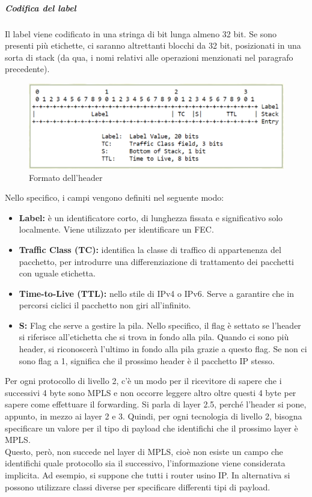 \documentclass{article}
\begin{document}
\subparagraph{Codifica del label} Il label viene codificato in una stringa di bit lunga almeno 32 bit. Se sono presenti più etichette, ci saranno altrettanti blocchi da 32 bit, posizionati in una sorta di stack (da qua, i nomi relativi alle operazioni menzionati nel paragrafo precedente).
\begin{figure}[H]
    \centering
    \includegraphics[scale=0.4]{figures/mpls header.png}
    \caption{Formato dell'header}
\end{figure}
Nello specifico, i campi vengono definiti nel seguente modo:
\begin{itemize}
    \item \textbf{Label:} è un identificatore corto, di lunghezza fissata e significativo solo localmente. Viene utilizzato per identificare un FEC.
    \item \textbf{Traffic Class (TC):} identifica la classe di traffico di appartenenza del pacchetto, per introdurre una differenziazione di trattamento dei pacchetti con uguale etichetta.
    \item \textbf{Time-to-Live (TTL):} nello stile di IPv4 o IPv6. Serve a garantire che in percorsi ciclici il pacchetto non giri all'infinito.
    \item \textbf{S:} Flag che serve a gestire la pila. Nello specifico, il flag è settato se l'header si riferisce all'etichetta che si trova in fondo alla pila. Quando ci sono più header, si riconoscerà l'ultimo in fondo alla pila grazie a questo flag. Se non ci sono flag a 1, significa che il prossimo header è il pacchetto IP stesso.
\end{itemize}
Per ogni protocollo di livello 2, c'è un modo per il ricevitore di sapere che i successivi 4 byte sono MPLS e non occorre leggere altro oltre questi 4 byte per sapere come effettuare il forwarding. Si parla di layer 2.5, perché l'header si pone, appunto, in mezzo ai layer 2 e 3. Quindi, per ogni tecnologia di livello 2, bisogna specificare un valore per il tipo di payload che identifichi che il prossimo layer è MPLS. \\ Questo, però, non succede nel layer di MPLS, cioè non esiste un campo che identifichi quale protocollo sia il successivo, l'informazione viene considerata implicita. Ad esempio, si suppone che tutti i router usino IP. In alternativa si possono utilizzare classi diverse per specificare differenti tipi di payload.
\end{document}
